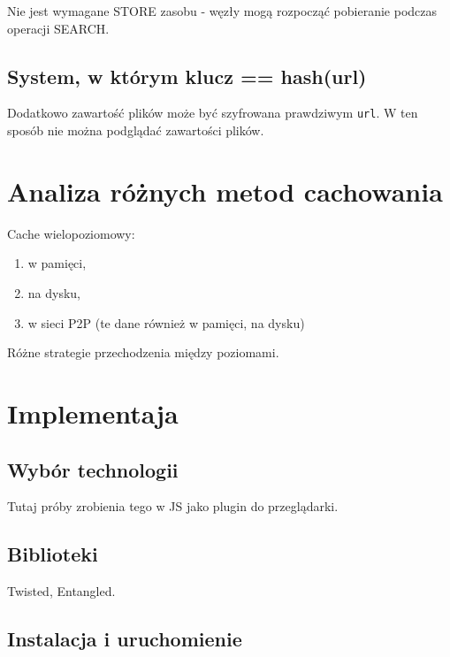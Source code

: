 \documentclass[a4paper,12pt]{scrartcl}
\newcommand{\f}{\texttt}
\begin{document}
Nie jest wymagane STORE zasobu - węzły mogą rozpocząć pobieranie podczas operacji SEARCH.

\subsection{System, w którym klucz == hash(url)}
Dodatkowo zawartość plików może być szyfrowana prawdziwym \f{url}.
W ten sposób nie można podglądać zawartości plików. 

\section{Analiza różnych metod cachowania}
Cache wielopoziomowy:
\begin{enumerate}
  \item w pamięci,
  \item na dysku,
  \item w sieci P2P (te dane również w pamięci, na dysku)
\end{enumerate}
Różne strategie przechodzenia między poziomami.


\section{Implementaja}
\subsection{Wybór technologii}
Tutaj próby zrobienia tego w JS jako plugin do przeglądarki.
\subsection{Biblioteki}
Twisted, Entangled.
\subsection{Instalacja i uruchomienie}





\end{document}
